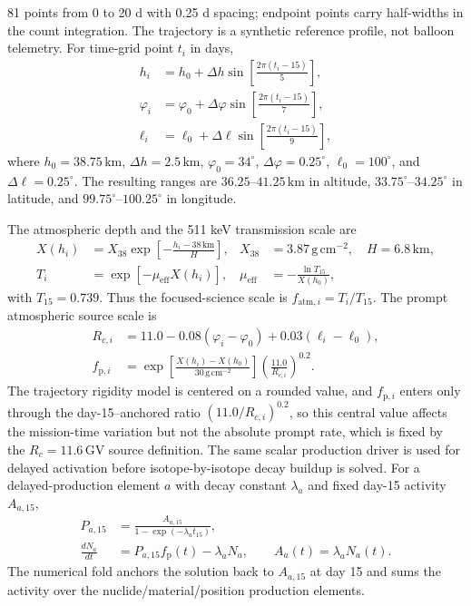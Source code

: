 \documentclass[11pt]{article}
\begin{document}
81 points from 0 to 20 d with 0.25 d spacing; endpoint points carry half-widths
in the count integration. The trajectory is a synthetic reference profile, not
balloon telemetry. For time-grid point $t_i$ in days,
\begin{align}
  h_i &= h_0+\Delta h\sin\!\left[\frac{2\pi(t_i-15)}{5}\right],\\
  \varphi_i &= \varphi_0+\Delta\varphi\sin\!\left[\frac{2\pi(t_i-15)}{7}\right],\\
  \ell_i &= \ell_0+\Delta\ell\sin\!\left[\frac{2\pi(t_i-15)}{9}\right],
\end{align}
where $h_0=38.75\,\mathrm{km}$, $\Delta h=2.5\,\mathrm{km}$,
$\varphi_0=34^\circ$, $\Delta\varphi=0.25^\circ$, $\ell_0=100^\circ$,
and $\Delta\ell=0.25^\circ$. The resulting ranges are
$36.25$--$41.25\,\mathrm{km}$ in altitude, $33.75^\circ$--$34.25^\circ$ in
latitude, and $99.75^\circ$--$100.25^\circ$ in longitude.

The atmospheric depth and the 511 keV transmission scale are
\begin{align}
  X(h_i) &= X_{38}\exp\!\left[-\frac{h_i-38\,\mathrm{km}}{H}\right],
       & X_{38}&=3.87\,\mathrm{g\,cm^{-2}},\quad H=6.8\,\mathrm{km},\\
  T_i &= \exp[-\mu_{\mathrm{eff}} X(h_i)],
       & \mu_{\mathrm{eff}}&=-\frac{\ln T_{15}}{X(h_0)},
\end{align}
with $T_{15}=0.739$. Thus the focused-science scale is
$f_{\mathrm{atm},i}=T_i/T_{15}$. The prompt atmospheric source scale is
\begin{align}
  R_{c,i} &= 11.0 -0.08(\varphi_i-\varphi_0)+0.03(\ell_i-\ell_0),\\
  f_{\mathrm{p},i} &=
  \exp\!\left[\frac{X(h_i)-X(h_0)}{30\,\mathrm{g\,cm^{-2}}}\right]
  \left(\frac{11.0}{R_{c,i}}\right)^{0.2}.
\end{align}
The trajectory rigidity model is centered on a rounded value, and $f_{\mathrm{p},i}$ enters only through the day-15--anchored ratio $(11.0/R_{c,i})^{0.2}$, so this central value affects the mission-time variation but not the absolute prompt rate, which is fixed by the $R_c=11.6\,\mathrm{GV}$ source definition. The same scalar production driver is used for delayed activation before
isotope-by-isotope decay buildup is solved. For a delayed-production element
$a$ with decay constant $\lambda_a$ and fixed day-15 activity $A_{a,15}$,
\begin{align}
  P_{a,15} &= \frac{A_{a,15}}{1-\exp(-\lambda_a t_{15})},\\
  \frac{dN_a}{dt} &= P_{a,15}f_{\mathrm{p}}(t)-\lambda_a N_a,\qquad
  A_a(t)=\lambda_a N_a(t).
\end{align}
The numerical fold anchors the solution back to $A_{a,15}$ at day 15 and sums
the activity over the nuclide/material/position production elements.
\end{document}
